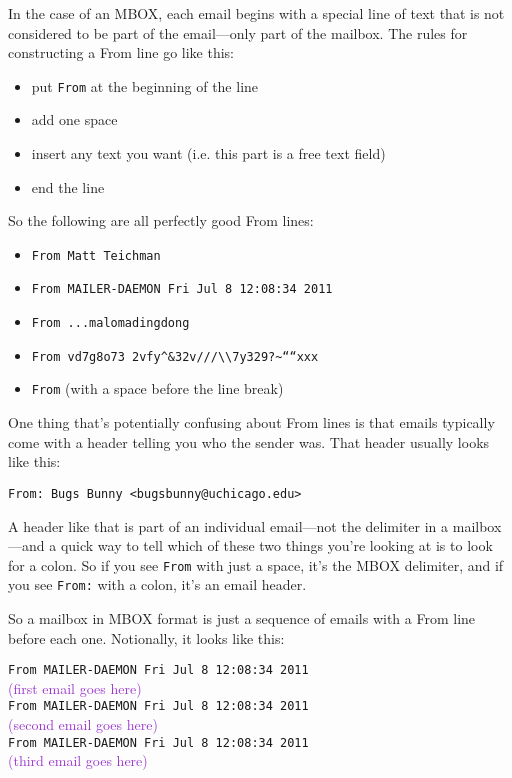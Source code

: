 \documentclass[11pt]{article}
\begin{document}
In the case of an MBOX, each email begins with a special line of text
that is not considered to be part of the email---only part of the
mailbox.  The rules for constructing a From line go like this:

\begin{itemize}
\item put \texttt{From} at the beginning of the line
\item add one space
\item insert any text you want (i.e. this part is a free text field)
\item end the line
\end{itemize}

So the following are all perfectly good From lines:

\begin{itemize}
\item \texttt{From Matt Teichman}
\item \texttt{From MAILER-DAEMON Fri Jul  8 12:08:34 2011}
\item \texttt{From ...malomadingdong}
\item \texttt{From vd7g8o73 2vfy\textasciicircum{}\&32v///\textbackslash{}\textbackslash{}7y329?\textasciitilde{}````xxx}
\item \texttt{From} (with a space before the line break)
\end{itemize}

One thing that's potentially confusing about From lines is that emails
typically come with a header telling you who the sender was.  That
header usually looks like this:

\begin{verbatim}
From: Bugs Bunny <bugsbunny@uchicago.edu>
\end{verbatim}

A header like that is part of an individual email---not the delimiter
in a mailbox---and a quick way to tell which of these two things
you're looking at is to look for a colon.  So if you see \texttt{From} with
just a space, it's the MBOX delimiter, and if you see \texttt{From:} with a
colon, it's an email header.

So a mailbox in MBOX format is just a sequence of emails with a From
line before each one.  Notionally, it looks like this:

\texttt{From MAILER-DAEMON Fri Jul  8 12:08:34 2011}\\
\textcolor{DarkOrchid}{(first email goes here)}\\
\texttt{From MAILER-DAEMON Fri Jul  8 12:08:34 2011}\\
\textcolor{DarkOrchid}{(second email goes here)}\\
\texttt{From MAILER-DAEMON Fri Jul  8 12:08:34 2011}\\
\textcolor{DarkOrchid}{(third email goes here)}\\
\vspace{-1em}
\end{document}
